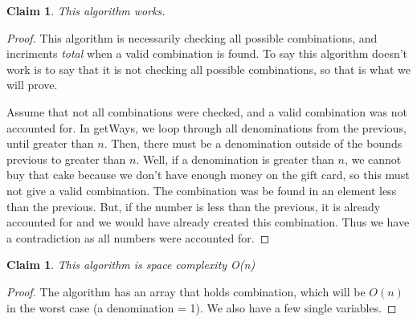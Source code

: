 \documentclass[11pt]{article}
\newtheorem{claim}[theorem]{Claim}
\begin{document}
	\begin{claim} 
		This algorithm works.
	\end{claim}
	
	\begin{proof}
		This algorithm is necessarily checking all possible combinations, and incriments \textit{total} when a valid combination is found. To say this algorithm doesn't work is to say that it is not checking all possible combinations, so that is what we will prove. 
		
		Assume that not all combinations were checked, and a valid combination was not accounted for. In getWays, we loop through all denominations from the previous, until greater than $n$. Then, there must be a denomination outside of the bounds previous to greater than $n$. Well, if a denomination is greater than $n$, we cannot buy that cake because we don't have enough money on the gift card, so this must not give a valid combination. The combination was be found in an element less than the previous. But, if the number is less than the previous, it is already accounted for and we would have already created this combination. Thus we have a contradiction as all numbers were accounted for. 
	\end{proof}
	
	\begin{claim} 
		This algorithm is space complexity O(n)
	\end{claim}
	
	\begin{proof}
		The algorithm has an array that holds combination, which will be $O(n)$ in the worst case (a denomination = 1). We also have a few single variables. 
	\end{proof}
	
	\newpage
	
	
\end{document}
